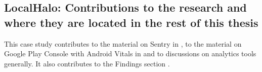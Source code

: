 \subsection{LocalHalo: Contributions to the research and where they are located in the rest of this thesis}
This case study contributes to the material on Sentry in , to the material on Google Play Console with Android Vitals in  and to discussions on analytics tools generally. It also contributes to the Findings section .

